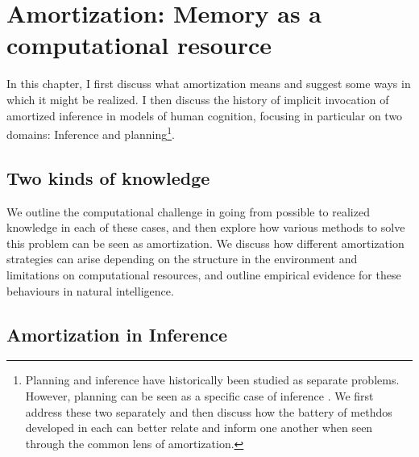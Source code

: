 \chapter{Amortization: Memory as a computational resource}
\label{chap:amort}


In this chapter, I first discuss what amortization means and suggest some ways in which it might be realized. I then discuss the history of implicit invocation of amortized inference in models of human cognition, focusing in particular on two domains: Inference and planning\footnote{Planning and inference have historically been studied as separate problems. However, planning can be seen as a specific case of inference \citep{botvinick2012planning}. We first address these two separately and then discuss how the battery of methdos developed in each can better relate and inform one another when seen through the common lens of amortization.}. 

\section{Two kinds of knowledge}

 We outline the computational challenge in going from possible to realized knowledge in each of these cases, and then explore how various methods to solve this problem can be seen as amortization. We discuss how different amortization strategies can arise depending on the structure in the environment and limitations on computational resources, and outline empirical evidence for these behaviours in natural intelligence.

\section{Amortization in Inference}

